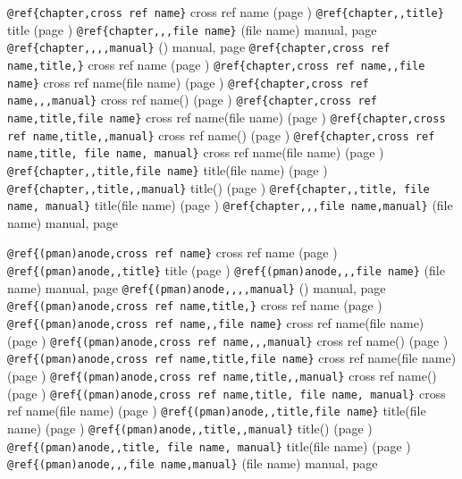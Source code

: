 \documentclass{book}
\begin{document}
\texttt{@ref\{chapter,cross ref name\}} cross ref name (page \pageref{anchor:chapter})
\texttt{@ref\{chapter,,title\}} title (page \pageref{anchor:chapter})
\texttt{@ref\{chapter,,,file name\}} (file name) manual, page \pageref{anchor:chapter}
\texttt{@ref\{chapter,,,,manual\}} () manual, page \pageref{anchor:chapter}
\texttt{@ref\{chapter,cross ref name,title,\}} cross ref name (page \pageref{anchor:chapter})
\texttt{@ref\{chapter,cross ref name,,file name\}} cross ref name(file name) (page \pageref{anchor:chapter})
\texttt{@ref\{chapter,cross ref name,,,manual\}} cross ref name() (page \pageref{anchor:chapter})
\texttt{@ref\{chapter,cross ref name,title,file name\}} cross ref name(file name) (page \pageref{anchor:chapter})
\texttt{@ref\{chapter,cross ref name,title,,manual\}} cross ref name() (page \pageref{anchor:chapter})
\texttt{@ref\{chapter,cross ref name,title, file name, manual\}} cross ref name(file name) (page \pageref{anchor:chapter})
\texttt{@ref\{chapter,,title,file name\}} title(file name) (page \pageref{anchor:chapter})
\texttt{@ref\{chapter,,title,,manual\}} title() (page \pageref{anchor:chapter})
\texttt{@ref\{chapter,,title, file name, manual\}} title(file name) (page \pageref{anchor:chapter})
\texttt{@ref\{chapter,,,file name,manual\}} (file name) manual, page \pageref{anchor:chapter}


\texttt{@ref\{(pman)anode,cross ref name\}} cross ref name (page \pageref{anchor:_0028pman_0029anode})
\texttt{@ref\{(pman)anode,,title\}} title (page \pageref{anchor:_0028pman_0029anode})
\texttt{@ref\{(pman)anode,,,file name\}} (file name) manual, page \pageref{anchor:_0028pman_0029anode}
\texttt{@ref\{(pman)anode,,,,manual\}} () manual, page \pageref{anchor:_0028pman_0029anode}
\texttt{@ref\{(pman)anode,cross ref name,title,\}} cross ref name (page \pageref{anchor:_0028pman_0029anode})
\texttt{@ref\{(pman)anode,cross ref name,,file name\}} cross ref name(file name) (page \pageref{anchor:_0028pman_0029anode})
\texttt{@ref\{(pman)anode,cross ref name,,,manual\}} cross ref name() (page \pageref{anchor:_0028pman_0029anode})
\texttt{@ref\{(pman)anode,cross ref name,title,file name\}} cross ref name(file name) (page \pageref{anchor:_0028pman_0029anode})
\texttt{@ref\{(pman)anode,cross ref name,title,,manual\}} cross ref name() (page \pageref{anchor:_0028pman_0029anode})
\texttt{@ref\{(pman)anode,cross ref name,title, file name, manual\}} cross ref name(file name) (page \pageref{anchor:_0028pman_0029anode})
\texttt{@ref\{(pman)anode,,title,file name\}} title(file name) (page \pageref{anchor:_0028pman_0029anode})
\texttt{@ref\{(pman)anode,,title,,manual\}} title() (page \pageref{anchor:_0028pman_0029anode})
\texttt{@ref\{(pman)anode,,title, file name, manual\}} title(file name) (page \pageref{anchor:_0028pman_0029anode})
\texttt{@ref\{(pman)anode,,,file name,manual\}} (file name) manual, page \pageref{anchor:_0028pman_0029anode}
\end{document}
